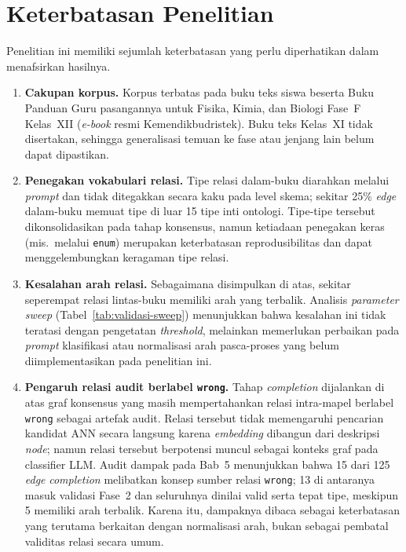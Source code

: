 \documentclass[../../thesis]{subfiles}
\begin{document}
\section{Keterbatasan Penelitian}

Penelitian ini memiliki sejumlah keterbatasan yang perlu diperhatikan dalam
menafsirkan hasilnya.

\begin{enumerate}
  \item \textbf{Cakupan korpus.} Korpus terbatas pada buku teks siswa beserta
        Buku Panduan Guru pasangannya untuk Fisika, Kimia, dan Biologi Fase~F
        Kelas~XII (\textit{e-book} resmi Kemendikbudristek). Buku teks Kelas~XI
        tidak disertakan, sehingga generalisasi temuan ke fase atau jenjang lain
        belum dapat dipastikan.

  \item \textbf{Penegakan vokabulari relasi.} Tipe relasi dalam-buku diarahkan
        melalui \textit{prompt} dan tidak ditegakkan secara kaku pada level
        skema; sekitar 25\% \textit{edge} dalam-buku memuat tipe di luar 15 tipe
        inti ontologi. Tipe-tipe tersebut dikonsolidasikan pada tahap konsensus,
        namun ketiadaan penegakan keras (mis.\ melalui \texttt{enum}) merupakan
        keterbatasan reprodusibilitas dan dapat menggelembungkan keragaman tipe
        relasi.

  \item \textbf{Kesalahan arah relasi.} Sebagaimana disimpulkan di atas, sekitar
        seperempat relasi lintas-buku memiliki arah yang terbalik. Analisis
        \textit{parameter sweep} (Tabel~\ref{tab:validasi-sweep}) menunjukkan bahwa
        kesalahan ini tidak teratasi dengan pengetatan \textit{threshold},
        melainkan memerlukan perbaikan pada \textit{prompt} klasifikasi atau
        normalisasi arah pasca-proses yang belum diimplementasikan pada
        penelitian ini.

  \item \textbf{Pengaruh relasi audit berlabel \texttt{wrong}.} Tahap
        \textit{completion} dijalankan di atas graf konsensus yang masih
        mempertahankan relasi intra-mapel berlabel \texttt{wrong} sebagai
        artefak audit. Relasi tersebut tidak memengaruhi pencarian kandidat ANN
        secara langsung karena \textit{embedding} dibangun dari deskripsi
        \textit{node}; namun relasi tersebut berpotensi muncul sebagai konteks
        graf pada classifier LLM. Audit dampak pada Bab~5 menunjukkan bahwa 15
        dari 125 \textit{edge} \textit{completion} melibatkan konsep sumber
        relasi \texttt{wrong}; 13 di antaranya masuk validasi Fase~2 dan
        seluruhnya dinilai valid serta tepat tipe, meskipun 5 memiliki arah
        terbalik. Karena itu, dampaknya dibaca sebagai keterbatasan yang
        terutama berkaitan dengan normalisasi arah, bukan sebagai pembatal
        validitas relasi secara umum.


\end{enumerate}
\end{document}
